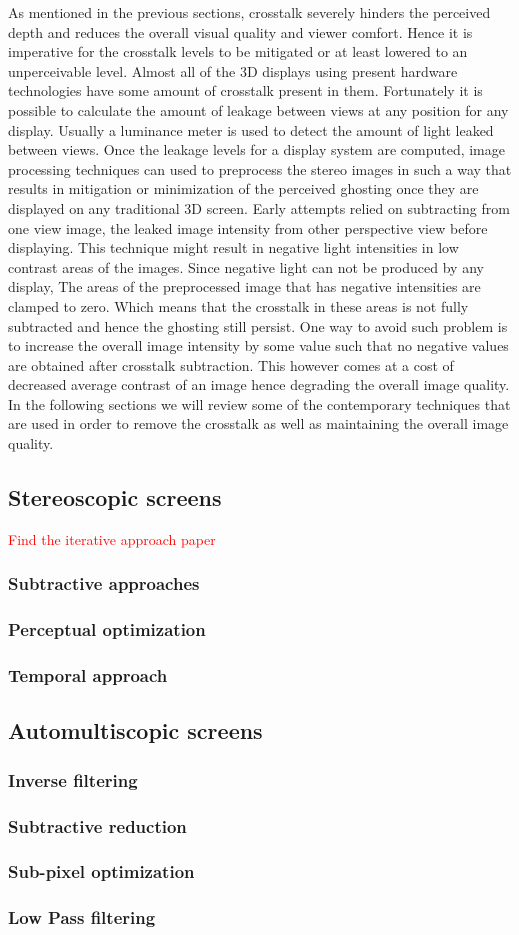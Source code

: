 As mentioned in the previous sections, crosstalk severely hinders the perceived depth and reduces the overall visual quality and viewer comfort. Hence it is imperative for the crosstalk levels to be mitigated or at least lowered to an unperceivable level. Almost all of the 3D displays using present hardware technologies have some amount of crosstalk present in them. Fortunately it is possible to calculate the amount of leakage between views at any position for any display. Usually a luminance meter is used to detect the amount of light leaked between views. Once the leakage levels for a display system are computed, image processing techniques can used to preprocess the stereo images in such a way that results in mitigation or minimization of the perceived ghosting once they are displayed on any traditional 3D screen. Early attempts relied on subtracting from one view image, the leaked image intensity from other perspective view before displaying. This technique might result in  negative light intensities in low contrast areas of the images. Since negative light can not be produced by any display, The areas of the preprocessed image that has negative intensities are clamped to zero. Which means that the crosstalk in these areas is not fully subtracted and hence the ghosting still persist. One way to avoid such problem is to increase the overall image intensity by some value such that no negative values are obtained after crosstalk subtraction. This however comes at a cost of decreased average contrast of an image hence degrading the overall image quality. In the following sections we will review some of the contemporary techniques that are used in order to remove the crosstalk as well as maintaining the overall image quality.

\subsection{Stereoscopic screens}
\textcolor{red}{Find the iterative approach paper}
\subsubsection{Subtractive approaches}
\subsubsection{Perceptual optimization}
\subsubsection{Temporal approach}

\subsection{Automultiscopic screens}
\subsubsection{Inverse filtering}
\subsubsection{Subtractive reduction}
\subsubsection{Sub-pixel optimization}
\subsubsection{Low Pass filtering}